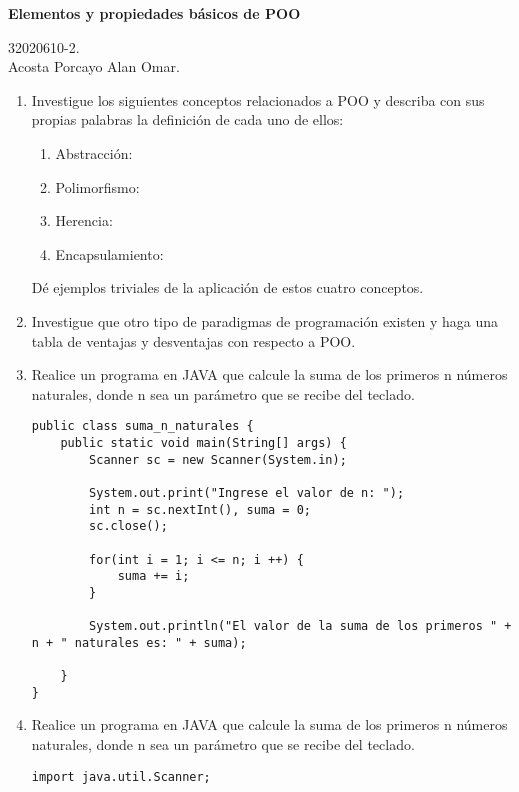 \documentclass[12pt]{article}
\begin{document}
    \begin{center}
        \large \textbf{Elementos y propiedades básicos de POO}
    \end{center}
    
    \begin{flushright}
        32020610-2. \\
        Acosta Porcayo Alan Omar.
    \end{flushright}

    \begin{enumerate}[leftmargin=*]
        \item Investigue los siguientes conceptos relacionados a POO y describa con sus propias palabras la definición de cada uno de ellos:
        \begin{enumerate}[leftmargin=*]
            \item Abstracción: 
            \item Polimorfismo:
            \item Herencia:
            \item Encapsulamiento:
        \end{enumerate}
        Dé ejemplos triviales de la aplicación de estos cuatro conceptos.

        \item Investigue que otro tipo de paradigmas de programación existen y haga una tabla de ventajas y desventajas con respecto a POO.

        \item Realice un programa en JAVA que calcule la suma de los primeros n números naturales, donde n sea un parámetro que se recibe del teclado. 
        \begin{lstlisting}
public class suma_n_naturales {
    public static void main(String[] args) {
        Scanner sc = new Scanner(System.in);

        System.out.print("Ingrese el valor de n: ");
        int n = sc.nextInt(), suma = 0;
        sc.close();

        for(int i = 1; i <= n; i ++) {
            suma += i;
        }

        System.out.println("El valor de la suma de los primeros " + n + " naturales es: " + suma);

    }
}
        \end{lstlisting}

        \item Realice un programa en JAVA que calcule la suma de los primeros n números naturales, donde n sea un parámetro que se recibe del teclado. 
        \begin{lstlisting}
import java.util.Scanner;


\end{lstlisting}
\end{enumerate}
\end{document}
